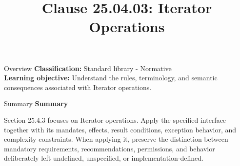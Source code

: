 \documentclass[10pt,letterpaper]{article}
\title{Clause 25.04.03: Iterator Operations}
\author{}
\date{}
\begin{document}
\maketitle
\begin{CornellOverviewBox}{Overview}
\textbf{Classification:} Standard library - Normative\\[2pt]
\textbf{Learning objective:} Understand the rules, terminology, and semantic consequences associated with Iterator operations.
\end{CornellOverviewBox}\begin{CornellSummaryBox}{Summary}
{\sffamily\bfseries\color{Accent} Summary}\par\vspace{3pt}Section 25.4.3 focuses on Iterator operations. Apply the specified interface together with its mandates, effects, result conditions, exception behavior, and complexity constraints. When applying it, preserve the distinction between mandatory requirements, recommendations, permissions, and behavior deliberately left undefined, unspecified, or implementation-defined.
\end{CornellSummaryBox}
\end{document}
